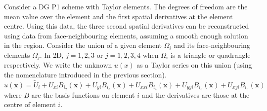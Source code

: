 \documentclass[11pt]{article}
\let\bld\boldsymbol
\begin{document}
Consider a DG P1 scheme with Taylor elements. The degrees of freedom are the mean value over the element and the first spatial derivatives at the element centre. Using this data, the three second spatial derivatives can be reconstructed using data from face-neighbouring elements, assuming a smooth enough solution in the region. Consider the union of a given element $\Omega_i$ and its face-neighbouring elements $\Omega_j$. In 2D, $j = 1,2,3$ or $j = 1,2,3,4$ when $\Omega_i$ is a triangle or quadrangle respectively. We write the unknown $u(x)$ as a Taylor series on this union (using the nomenclature introduced in the previous section).
\begin{equation}
u(\bld{x}) = \tilde{U}_i + U_{xi}B_{i_2}(\bld{x}) + U_{yi}B_{i_3}(\bld{x}) + U_{xxi} B_{i_4}(\bld{x}) + U_{yyi} B_{i_5}(\bld{x}) + U_{xyi} B_{i_6}(\bld{x})
\end{equation}
where $B$ are the basis functions on element $i$ and the derivatives are those at the centre of element $i$.
\end{document}
